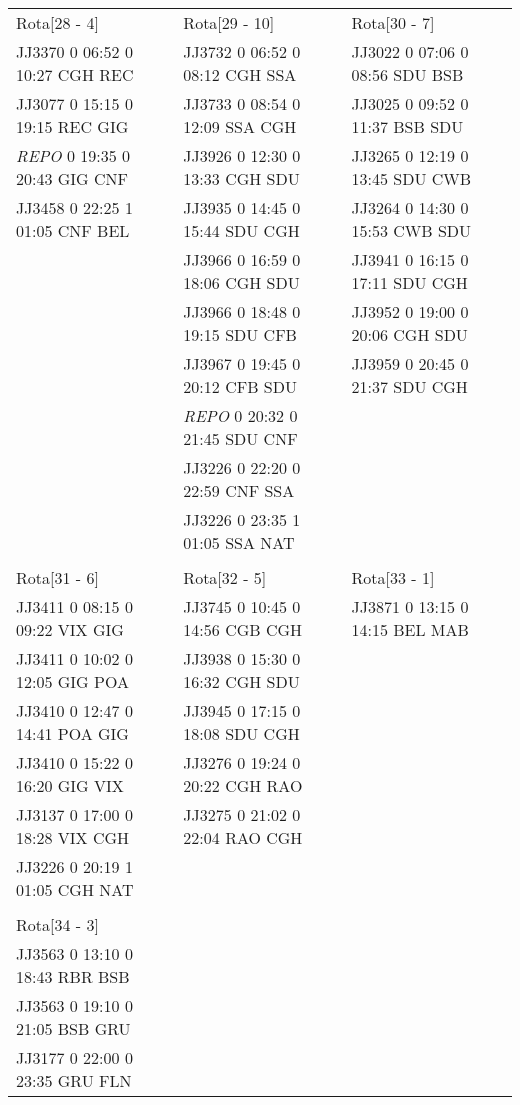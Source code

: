 \begin{scriptsize}
\begin{longtable}{l l l}
\\

Rota[28 - 4]  & Rota[29 - 10]  & Rota[30 - 7] \\
JJ3370 0 06:52 0 10:27 CGH REC & JJ3732 0 06:52 0 08:12 CGH SSA & JJ3022 0 07:06 0 08:56 SDU BSB\\
JJ3077 0 15:15 0 19:15 REC GIG & JJ3733 0 08:54 0 12:09 SSA CGH & JJ3025 0 09:52 0 11:37 BSB SDU\\
\textit{REPO}   0 19:35 0 20:43 GIG CNF & JJ3926 0 12:30 0 13:33 CGH SDU &
JJ3265 0 12:19 0 13:45 SDU CWB\\
JJ3458 0 22:25 1 01:05 CNF BEL & JJ3935 0 14:45 0 15:44 SDU CGH & JJ3264 0 14:30 0 15:53 CWB SDU\\
 & JJ3966 0 16:59 0 18:06 CGH SDU & JJ3941 0 16:15 0 17:11 SDU CGH\\
 & JJ3966 0 18:48 0 19:15 SDU CFB & JJ3952 0 19:00 0 20:06 CGH SDU\\
 & JJ3967 0 19:45 0 20:12 CFB SDU & JJ3959 0 20:45 0 21:37 SDU CGH\\
 & \textit{REPO}   0 20:32 0 21:45 SDU CNF &\\
 & JJ3226 0 22:20 0 22:59 CNF SSA &\\
 & JJ3226 0 23:35 1 01:05 SSA NAT &\\

\\

Rota[31 - 6]  & Rota[32 - 5]  & Rota[33 - 1] \\
JJ3411 0 08:15 0 09:22 VIX GIG & JJ3745 0 10:45 0 14:56 CGB CGH & JJ3871 0 13:15 0 14:15 BEL MAB\\
JJ3411 0 10:02 0 12:05 GIG POA & JJ3938 0 15:30 0 16:32 CGH SDU\\
JJ3410 0 12:47 0 14:41 POA GIG & JJ3945 0 17:15 0 18:08 SDU CGH\\
JJ3410 0 15:22 0 16:20 GIG VIX & JJ3276 0 19:24 0 20:22 CGH RAO\\
JJ3137 0 17:00 0 18:28 VIX CGH & JJ3275 0 21:02 0 22:04 RAO CGH\\
JJ3226 0 20:19 1 01:05 CGH NAT\\

\\

Rota[34 - 3]  \\
JJ3563 0 13:10 0 18:43 RBR BSB\\
JJ3563 0 19:10 0 21:05 BSB GRU\\
JJ3177 0 22:00 0 23:35 GRU FLN\\

\end{longtable}

\end{scriptsize}